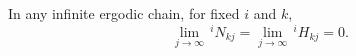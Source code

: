 In any infinite ergodic chain, for fixed $i$ and $k$,
$$\lim_{j \to \infty} \,^{i}\!N_{kj} = \lim_{j \to \infty} \,^{i}\!H_{kj} = 0.$$
